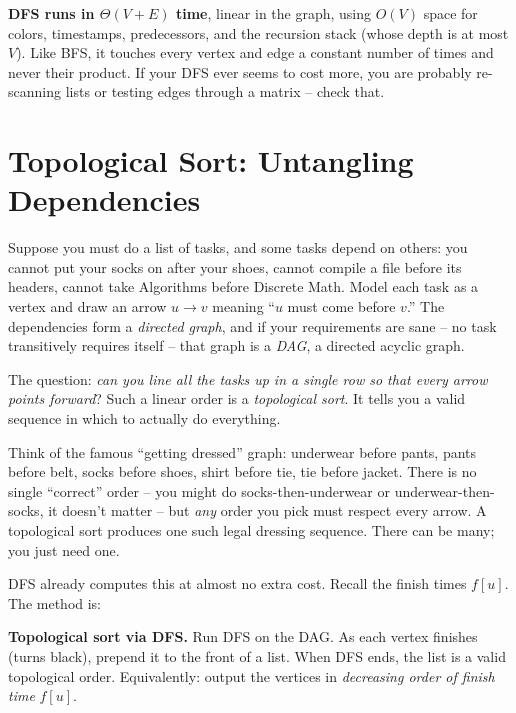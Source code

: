 \begin{complexitybox}
\textbf{DFS runs in $\Theta(V + E)$ time}, linear in the graph, using $O(V)$
space for colors, timestamps, predecessors, and the recursion stack (whose depth
is at most $V$). Like BFS, it touches every vertex and edge a constant number of
times and never their product. If your DFS ever seems to cost more, you are
probably re-scanning lists or testing edges through a matrix -- check that.
\end{complexitybox}

\section{Topological Sort: Untangling Dependencies}
\label{ch22:toposort}

Suppose you must do a list of tasks, and some tasks
depend on others: you cannot put your socks on after your shoes, cannot compile
a file before its headers, cannot take Algorithms before Discrete Math. Model
each task as a vertex and draw an arrow $u \to v$ meaning ``$u$ must come before
$v$.'' The dependencies form a \emph{directed graph}, and if your requirements
are sane -- no task transitively requires itself -- that graph is a \emph{DAG}, a
directed acyclic graph.

The question: \emph{can you line all the tasks up in a single row so that every
arrow points forward}? Such a linear order is a \emph{topological sort}. It tells
you a valid sequence in which to actually do everything.

\begin{intuitionbox}
Think of the famous ``getting dressed'' graph: underwear before pants, pants
before belt, socks before shoes, shirt before tie, tie before jacket. There is
no single ``correct'' order -- you might do socks-then-underwear or
underwear-then-socks, it doesn't matter -- but \emph{any} order you pick must
respect every arrow. A topological sort produces one such legal dressing
sequence. There can be many; you just need one.
\end{intuitionbox}

DFS already computes this at almost no extra cost. Recall the finish times
$f[u]$. The method is:

\begin{formalbox}
\textbf{Topological sort via DFS.} Run DFS on the DAG. As each vertex finishes
(turns black), prepend it to the front of a list. When DFS ends, the list is a
valid topological order. Equivalently: output the vertices in \emph{decreasing
order of finish time} $f[u]$.
\end{formalbox}

